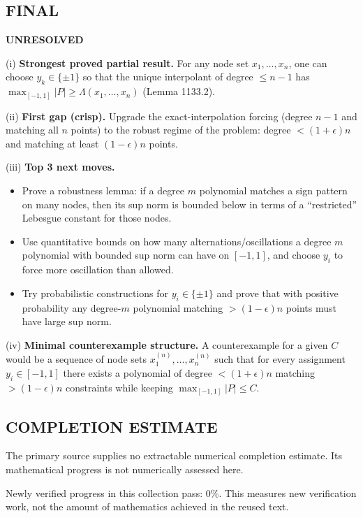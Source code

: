 \subsection*{FINAL}
\textbf{UNRESOLVED}

(i) \textbf{Strongest proved partial result.}
For any node set $x_1,\dots,x_n$, one can choose $y_k\in\{\pm 1\}$ so that the unique interpolant of degree $\le n-1$ has $\max_{[-1,1]}|P|\ge \Lambda(x_1,\dots,x_n)$ (Lemma 1133.2).

(ii) \textbf{First gap (crisp).}
Upgrade the exact-interpolation forcing (degree $n-1$ and matching all $n$ points) to the robust regime of the problem: degree $<(1+\epsilon)n$ and matching at least $(1-\epsilon)n$ points.

(iii) \textbf{Top 3 next moves.}
\begin{itemize}
\item Prove a robustness lemma: if a degree $m$ polynomial matches a sign pattern on many nodes, then its sup norm is bounded below in terms of a ``restricted'' Lebesgue constant for those nodes.
\item Use quantitative bounds on how many alternations/oscillations a degree $m$ polynomial with bounded sup norm can have on $[-1,1]$, and choose $y_i$ to force more oscillation than allowed.
\item Try probabilistic constructions for $y_i\in\{\pm 1\}$ and prove that with positive probability any degree-$m$ polynomial matching $>(1-\epsilon)n$ points must have large sup norm.
\end{itemize}

(iv) \textbf{Minimal counterexample structure.}
A counterexample for a given $C$ would be a sequence of node sets $x^{(n)}_1,\dots,x^{(n)}_n$ such that for every assignment $y_i\in[-1,1]$ there exists a polynomial of degree $<(1+\epsilon)n$ matching $>(1-\epsilon)n$ constraints while keeping $\max_{[-1,1]}|P|\le C$.




\subsection*{COMPLETION ESTIMATE}
The primary source supplies no extractable numerical completion estimate. Its mathematical progress is not numerically assessed here.

Newly verified progress in this collection pass: $0\%$. This measures new verification work, not the amount of mathematics achieved in the reused text.
